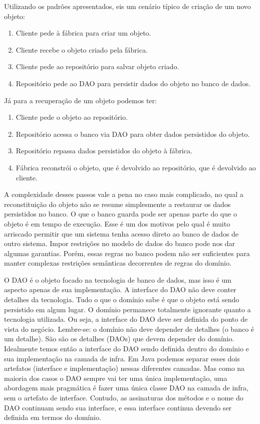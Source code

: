 \documentclass[a4paper, 12pt]{article}
\begin{document}
Utilizando os padrões apresentados, eis um cenário típico de criação de um novo objeto:

\begin{enumerate}
\item Cliente pede à fábrica para criar um objeto.
\item Cliente recebe o objeto criado pela fábrica.
\item Cliente pede ao repositório para salvar objeto criado.
\item Repositório pede ao DAO para persistir dados do objeto no banco de dados.
\end{enumerate}

Já para a recuperação de um objeto podemos ter:

\begin{enumerate}
\item Cliente pede o objeto ao repositório.
\item Repositório acessa o banco via DAO para obter dados persistidos do objeto.
\item Repositório repassa dados persistidos do objeto à fábrica.
\item Fábrica reconstrói o objeto, que é devolvido ao repositório, que é devolvido ao cliente.
\end{enumerate}

A complexidade desses passos vale a pena no caso mais complicado, no qual a reconstituição do objeto não se resume simplesmente a restaurar os dados persistidos no banco. O que o banco guarda pode ser apenas parte do que o objeto é em tempo de execução. Esse é um dos motivos pelo qual é muito arriscado permitir que um sistema tenha acesso direto ao banco de dados de outro sistema. Impor restrições no modelo de dados do banco pode nos dar algumas garantias. Porém, essas regras no banco podem não ser suficientes para manter complexas restrições semânticas decorrentes de regras do domínio.

O DAO é o objeto focado na tecnologia de banco de dados, mas isso é um aspecto apenas de sua implementação. A interface do DAO não deve conter detalhes da tecnologia. Tudo o que o domínio sabe é que o objeto está sendo persistido em algum lugar. O domínio permanece totalmente ignorante quanto a tecnologia utilizada. Ou seja, a interface do DAO deve ser definida do ponto de vista do negócio. Lembre-se: o domínio não deve depender de detalhes (o banco é um detalhe). São são os detalhes (DAOs) que devem depender do domínio. Idealmente temos então a interface do DAO sendo definida dentro do domínio e sua implementação na camada de infra. Em Java podemos separar esses dois artefatos (interface e implementação) nessas diferentes camadas. Mas como na maioria dos casos o DAO sempre vai ter uma única implementação, uma abordagem mais pragmática é fazer uma única classe DAO na camada de infra, sem o artefato de interface. Contudo, as assinaturas dos métodos e o nome do DAO continuam sendo sua interface, e essa interface continua devendo ser definida em termos do domínio.
\end{document}
